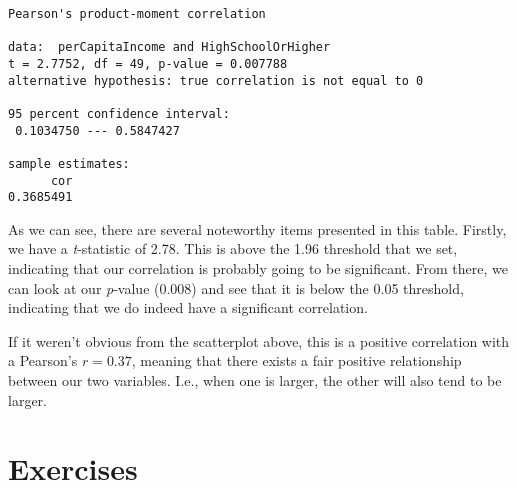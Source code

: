 \begin{framed}
\begin{Verbatim}[samepage=TRUE]
  Pearson's product-moment correlation

data:  perCapitaIncome and HighSchoolOrHigher
t = 2.7752, df = 49, p-value = 0.007788
alternative hypothesis: true correlation is not equal to 0

95 percent confidence interval:
 0.1034750 --- 0.5847427

sample estimates:
      cor 
0.3685491 
\end{Verbatim}
\end{framed}

As we can see, there are several noteworthy items presented in this table. Firstly, we have a \textit{t}-statistic of 2.78. This is above the 1.96 threshold that we set, indicating that our correlation is probably going to be significant. From there, we can look at our \textit{p}-value (0.008) and see that it is below the 0.05 threshold, indicating that we do indeed have a significant correlation.

If it weren't obvious from the scatterplot above, this is a positive correlation with a Pearson's $r=0.37$, meaning that there exists a fair positive relationship between our two variables. I.e., when one is larger, the other will also tend to be larger.

\section{Exercises}

